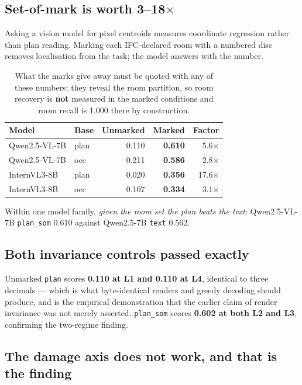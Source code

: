 \documentclass[11pt,a4paper]{article}
\newcommand{\code}[1]{\texttt{\small #1}}
\begin{document}
\subsection{Set-of-mark is worth 3--18$\times$}

Asking a vision model for pixel centroids measures coordinate regression rather
than plan reading. Marking each IFC-declared room with a numbered disc removes
localisation from the task; the model answers with the number.

\begin{table}[ht]
\centering
\small
\begin{tabular}{llrrr}
\toprule
Model & Base & Unmarked & Marked & Factor \\
\midrule
Qwen2.5-VL-7B & plan & 0.110 & \textbf{0.610} & 5.6$\times$ \\
Qwen2.5-VL-7B & occ  & 0.211 & \textbf{0.586} & 2.8$\times$ \\
InternVL3-8B  & plan & 0.020 & \textbf{0.356} & 17.6$\times$ \\
InternVL3-8B  & occ  & 0.107 & \textbf{0.334} & 3.1$\times$ \\
\bottomrule
\end{tabular}
\caption{What the marks give away must be quoted with any of these numbers:
they reveal the room partition, so room recovery is \textbf{not} measured in
the marked conditions and room recall is 1.000 there by construction.}
\end{table}

Within one model family, \emph{given the room set the plan beats the text}:
Qwen2.5-VL-7B \code{plan\_som} 0.610 against Qwen2.5-7B \code{text} 0.562.

\subsection{Both invariance controls passed exactly}

Unmarked \code{plan} scores \textbf{0.110 at L1 and 0.110 at L4}, identical to
three decimals --- which is what byte-identical renders and greedy decoding
should produce, and is the empirical demonstration that the earlier claim of
render invariance was not merely asserted. \code{plan\_som} scores
\textbf{0.602 at both L2 and L3}, confirming the two-regime finding.

\subsection{The damage axis does not work, and that is the finding}
\end{document}
